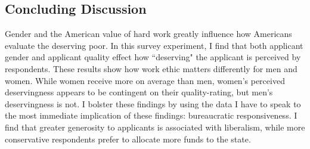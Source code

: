 \documentclass[12pt]{article}%
\begin{document}
\begin{doublespace}
\section*{Concluding Discussion} 
Gender and the American value of hard work greatly influence how Americans evaluate the deserving poor. In this survey experiment, I find that both applicant gender and applicant quality effect how ``deserving" the applicant is perceived by respondents. These results show how work ethic matters differently for men and women. While women receive more on average than men, women's perceived deservingness appears to be contingent on their quality-rating, but men's deservingness is not. I bolster these findings by using the data I have to speak to the most immediate implication of these findings: bureaucratic responsiveness. I find that greater generosity to applicants is associated with liberalism, while more conservative respondents prefer to allocate more funds to the state.

\end{doublespace}



\end{document}
